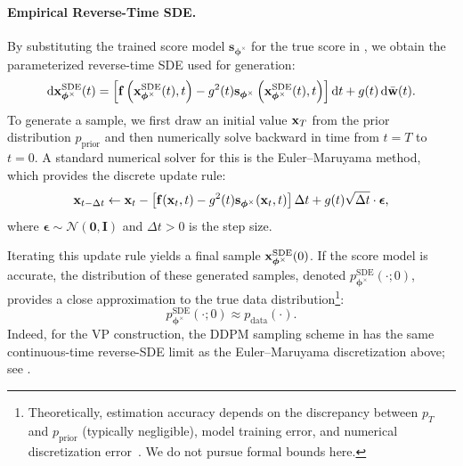 \paragraph{Empirical Reverse-Time SDE.}  
By substituting the trained score model $\mathbf{s}_{\bm{\phi}^\times}$ for the true score in , we obtain the parameterized reverse-time SDE used for generation:
\begin{equation}\label{eq:sde_backward_sub}
    \mathop{}\!\mathrm{d} {\mathbf{x}}^{\mathrm{SDE}}_{\bm{\phi}^\times}(t) = \left[\mathbf{f}\left({\mathbf{x}}^{\mathrm{SDE}}_{\bm{\phi}^\times}(t), t\right) - g^2(t) \mathbf{s}_{\bm{\phi}^\times}\left({\mathbf{x}}^{\mathrm{SDE}}_{\bm{\phi}^\times}(t), t\right) \right] \mathop{}\!\mathrm{d} t + g(t) \mathop{}\!\mathrm{d} \bar{{\mathbf{w}}}(t).
\end{equation}
To generate a sample, we first draw an initial value ${\mathbf{x}}_T$ from the prior distribution $p_{\mathrm{prior}}$ and then numerically solve  backward in time from $t=T$ to $t=0$. A standard numerical solver for this is the Euler–Maruyama method, which provides the discrete update rule:
\begin{equation}\label{eq:euler-maruyama}
{\mathbf{x}}_{t - \Delta t} \leftarrow {\mathbf{x}}_t - \left[ \mathbf{f}({\mathbf{x}}_t, t) - g^2(t)  \mathbf{s}_{\bm{\phi}^\times}({\mathbf{x}}_t, t) \right] \Delta t + g(t) \sqrt{\Delta t} \cdot \boldsymbol{\epsilon},
\end{equation}
where $\boldsymbol{\epsilon} \sim \mathcal{N}(\bm{0}, \mathbf{I})$ and $\Delta t > 0$ is the step size.

Iterating this update rule yields a final sample ${\mathbf{x}}^{\mathrm{SDE}}_{\bm{\phi}^\times}(0)$. If the score model is accurate, the distribution of these generated samples, denoted $p_{\bm{\phi}^\times}^{\mathrm{SDE}}(\cdot; 0)$, provides a close approximation to the true data distribution\footnote{Theoretically, estimation accuracy depends on the discrepancy between $p_T$ and $p_{\mathrm{prior}}$ (typically negligible), model training error, and numerical discretization error~\citep{de2022convergence,wang2024evaluating}. We do not pursue formal bounds here.}:
\[
p_{\bm{\phi}^\times}^{\mathrm{SDE}}(\cdot; 0) \approx p_{\mathrm{data}}(\cdot).
\]
Indeed, for the VP construction, the DDPM sampling scheme in
 has the same continuous-time reverse-SDE limit as the
Euler--Maruyama discretization above; see .


